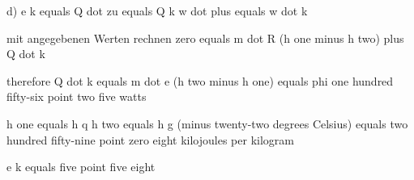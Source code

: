 d) e k equals Q dot zu equals Q k  
w dot plus equals w dot k  

mit angegebenen Werten rechnen  
zero equals m dot R (h one minus h two) plus Q dot k  

therefore Q dot k equals m dot e (h two minus h one) equals phi one hundred fifty-six point two five watts  

h one equals h q  
h two equals h g (minus twenty-two degrees Celsius) equals two hundred fifty-nine point zero eight kilojoules per kilogram  

e k equals five point five eight